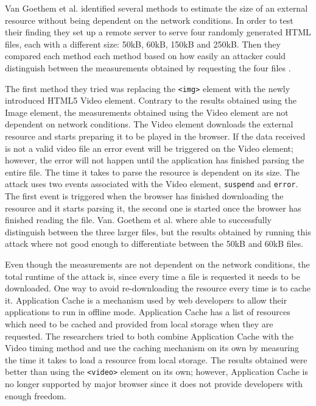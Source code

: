 \documentclass[10pt,a4paper,twoside]{book}
\begin{document}
Van Goethem et al. identified several methods to estimate the size of an external resource without being dependent on the network conditions. In order to test their finding they set up a remote server to serve four randomly generated HTML files, each with a different size: 50kB, 60kB, 150kB and 250kB. Then they compared each method each method based on how easily an attacker could distinguish between the measurements obtained by requesting the four files \cite{van2015clock}.

The first method they tried was replacing the \texttt{<img>} element with the newly introduced HTML5 Video element. Contrary to the results obtained using the Image element, the measurements obtained using the Video element are not dependent on network conditions. The Video element downloads the external resource and starts preparing it to be played in the browser. If the data received is not a valid video file an error event will be triggered on the Video element; however, the error will not happen until the application has finished parsing the entire file. The time it takes to parse the resource is dependent on its size. The attack uses two events associated with the Video element, \texttt{suspend} and \texttt{error}. The first event is triggered when the browser has finished downloading the resource and it starts parsing it, the second one is started once the browser has finished reading the file. Van. Goethem et al. where able to successfully distinguish between the three larger files, but the results obtained by running this attack where not good enough to differentiate between the 50kB and 60kB files.

Even though the measurements are not dependent on the network conditions, the total runtime of the attack is, since every time a file is requested it needs to be downloaded. One way to avoid re-downloading the resource every time is to cache it. Application Cache is a mechanism used by web developers to allow their applications to run in offline mode. Application Cache has a list of resources which need to be cached and provided from local storage when they are requested. The researchers tried to both combine Application Cache with the Video timing method and use the caching mechanism on its own by measuring the time it takes to load a resource from local storage. The results obtained were better than using the \texttt{<video>} element on its own; however, Application Cache is no longer supported by major browser since it does not provide developers with enough freedom.
\end{document}
